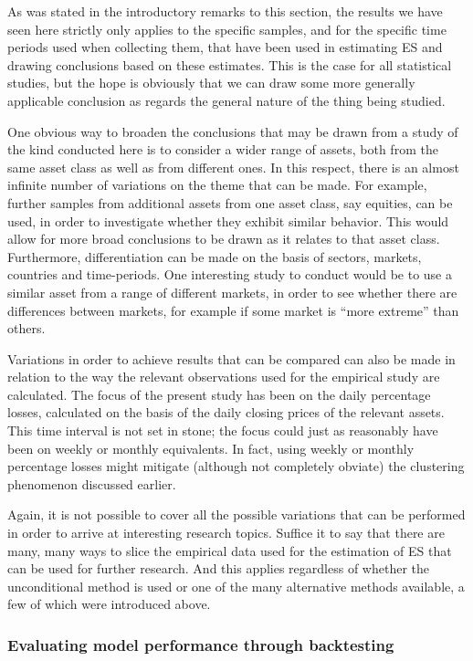 \documentclass[a4paper,11pt]{article}
\theoremstyle{definition}
\theoremstyle{definition}
\theoremstyle{definition}
\theoremstyle{definition}
\theoremstyle{remark}
\begin{document}
As was stated in the introductory remarks to this section, the results we have seen here strictly only applies to the specific samples, and for the specific time periods used when collecting them, that have been used in estimating ES and drawing conclusions based on these estimates. This is the case for all statistical studies, but the hope is obviously that we can draw some more generally applicable conclusion as regards the general nature of the thing being studied.

One obvious way to broaden the conclusions that may be drawn from a study of the kind conducted here is to consider a wider range of assets, both from the same asset class as well as from different ones. In this respect, there is an almost infinite number of variations on the theme that can be made. For example, further samples from additional assets from one asset class, say equities, can be used, in order to investigate whether they exhibit similar behavior. This would allow for more broad conclusions to be drawn as it relates to that asset class. Furthermore, differentiation can be made on the basis of sectors, markets, countries and time-periods. One interesting study to conduct would be to use a similar asset from a range of different markets, in order to see whether there are differences between markets, for example if some market is ``more extreme'' than others.

Variations in order to achieve results that can be compared can also be made in relation to the way the relevant observations used for the empirical study are calculated. The focus of the present study has been on the daily percentage losses, calculated on the basis of the daily closing prices of the relevant assets. This time interval is not set in stone; the focus could just as reasonably have been on weekly or monthly equivalents. In fact, using weekly or monthly percentage losses might mitigate (although not completely obviate) the clustering phenomenon discussed earlier.

Again, it is not possible to cover all the possible variations that can be performed in order to arrive at interesting research topics. Suffice it to say that there are many, many ways to slice the empirical data used for the estimation of ES that can be used for further research. And this applies regardless of whether the unconditional method is used or one of the many alternative methods available, a few of which were introduced above.

\hypertarget{evaluating-model-performance-through-backtesting}{%
\subsubsection{Evaluating model performance through backtesting}\label{evaluating-model-performance-through-backtesting}}
\end{document}
